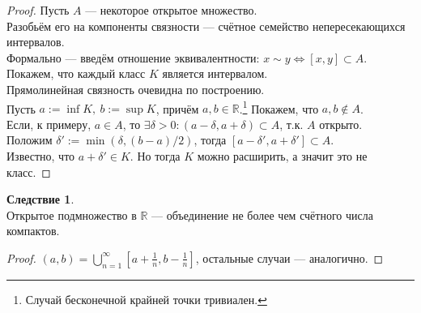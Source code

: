 \documentclass[11pt,a4paper]{report}
\def\Real{\mathbb{R}}
\theoremstyle{definition}
\theoremstyle{definition}
\newtheorem{corollary}{Следствие}[section]
\theoremstyle{definition}
\begin{document}
	\begin{proof}
		Пусть $ A $ ­— некоторое открытое множество.\\
		Разобьём его на компоненты связности — счётное семейство непересекающихся интервалов.\\
		Формально — введём отношение эквивалентности: $ x \sim y \iff [x, y] \subset A $.\\
		Покажем, что каждый класс $ K $ является интервалом.\\
		Прямолинейная связность очевидна по построению.\\
		Пусть $ a := \inf K,\ b := \sup K $, причём $ a, b \in \Real $.\footnote{Случай бесконечной крайней точки тривиален.} Покажем, что $ a, b \not \in A $.\\
		Если, к примеру, $ a \in A $, то $ \exists \delta > 0: (a - \delta, a + \delta) \subset A $, т.к. $ A $ открыто.\\ 
		Положим $ \delta' := \min(\delta, (b - a)/2) $, тогда $ [a - \delta', a + \delta'] \subset A $.\\
		Известно, что $ a + \delta' \in K $. Но тогда $ K $ можно расширить, а значит это не класс.
	\end{proof}
	\begin{corollary}$  $\\
		Открытое подмножество в $ \Real $ — объединение не более чем счётного числа компактов.
	\end{corollary}
	\begin{proof}
		$ (a, b) = \bigcup\limits_{n=1}^{\infty}{ [a + \frac{1}{n}, b - \frac{1}{n}] } $, остальные случаи — аналогично.
	\end{proof}
\end{document}
